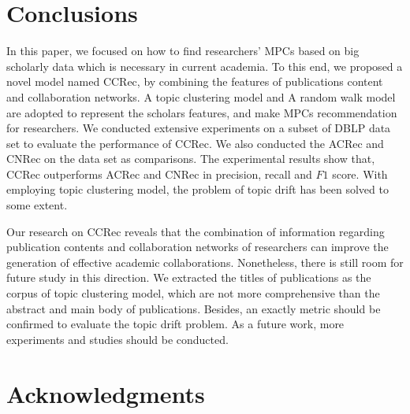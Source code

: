 \documentclass{acm_proc_article-sp}
\begin{document}
\section{Conclusions}
In this paper, we focused on how to find researchers' MPCs based on big scholarly data which is necessary in current academia. To this end, we proposed a novel model named CCRec, by combining the features of publications content and collaboration networks. A topic clustering model and A random walk model are adopted to represent the scholars features, and make MPCs recommendation for researchers. We conducted extensive experiments on a subset of DBLP data set to evaluate the performance of CCRec. We also conducted the ACRec and CNRec on the data set as comparisons. The experimental results show that, CCRec outperforms ACRec and CNRec in precision, recall and $F1$ score. With employing topic clustering model, the problem of topic drift has been solved to some extent.

Our research on CCRec reveals that the combination of information regarding publication contents and collaboration networks of researchers can improve the generation of effective academic collaborations. Nonetheless, there is still room for future study in this direction. We extracted the titles of publications as the corpus of topic clustering model, which are not more comprehensive than the abstract and main body of publications. Besides, an exactly metric should be confirmed to evaluate the topic drift problem. As a future work, more experiments and studies should be conducted.

\section{Acknowledgments}



\balancecolumns
\end{document}
